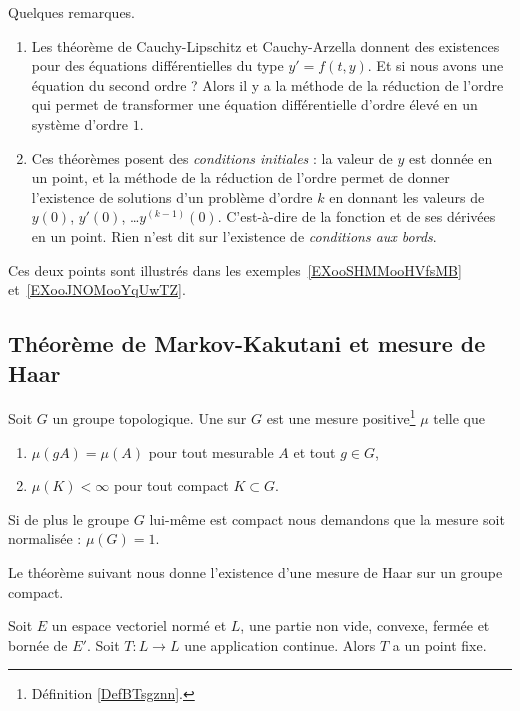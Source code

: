 \begin{remark}
    Quelques remarques.
    \begin{enumerate}
        \item
    Les théorème de Cauchy-Lipschitz et Cauchy-Arzella donnent des existences pour des équations différentielles du type \( y'=f(t,y)\). Et si nous avons une équation du second ordre ? Alors il y a la méthode de la réduction de l'ordre qui permet de transformer une équation différentielle d'ordre élevé en un système d'ordre \( 1\).
\item
    Ces théorèmes posent des \emph{conditions initiales} : la valeur de \( y\) est donnée en un point, et la méthode de la réduction de l'ordre permet de donner l'existence de solutions d'un problème d'ordre \( k\) en donnant les valeurs de \( y(0)\), \( y'(0)\), \ldots \( y^{(k-1)}(0)\). C'est-à-dire de la fonction et de ses dérivées en un point. Rien n'est dit sur l'existence de \emph{conditions aux bords}.
    \end{enumerate}
    Ces deux points sont illustrés dans les exemples~\ref{EXooSHMMooHVfsMB} et~\ref{EXooJNOMooYqUwTZ}.
\end{remark}

\subsection{Théorème de Markov-Kakutani et mesure de Haar}

\begin{definition}
    Soit \( G\) un groupe topologique. Une  sur \( G\) est une mesure positive\footnote{Définition \ref{DefBTsgznn}.} \( \mu\) telle que
    \begin{enumerate}
        \item
            \( \mu(gA)=\mu(A)\) pour tout mesurable \( A\) et tout \( g\in G\),
        \item
            \( \mu(K)<\infty\) pour tout compact \( K\subset G\).
    \end{enumerate}
    Si de plus le groupe \( G\) lui-même est compact nous demandons que la mesure soit normalisée : \( \mu(G)=1\).
\end{definition}

Le théorème suivant nous donne l'existence d'une mesure de Haar sur un groupe compact.
\begin{theorem}   \label{ThoeJCdMP}
    Soit \( E\) un espace vectoriel normé et \( L\), une partie non vide, convexe, fermée et bornée de \( E'\). Soit \( T\colon L\to L\) une application continue. Alors \( T\) a un point fixe.
\end{theorem}

